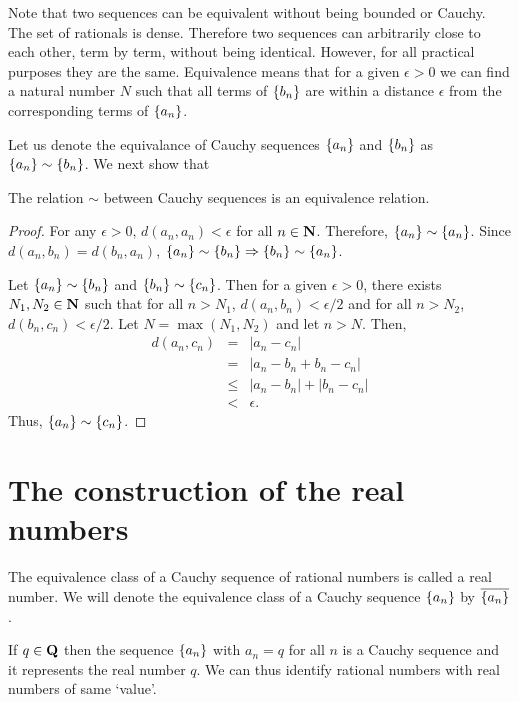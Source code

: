 Note that two sequences can be equivalent without being bounded or Cauchy.
The set of rationals is dense. Therefore two sequences can arbitrarily 
close to each other, term by term, without being identical. However, for
all practical purposes they are the same. Equivalence means that for a
given $\epsilon > 0$ we can find a natural number $N$ such that all terms
of $\{b_n\}$ are within a distance $\epsilon$ from the corresponding 
terms of $\{a_n\}$.

Let us denote the equivalance of Cauchy sequences $\{a_n\}$ and 
$\{b_n\}$ as $\{a_n\} \sim \{b_n\}$. We next show that
\begin{prop}\label{c4s2p1}
The relation $\sim$ between Cauchy sequences is an equivalence relation.
\end{prop}
\begin{proof}
For any $\epsilon > 0$, $d(a_n, a_n) < \epsilon$ for all $n \in \mathbf{N}$.
Therefore, $\{a_n\} \sim \{a_n\}$. Since $d(a_n, b_n) = d(b_n, a_n)$, 
$\{a_n\} \sim \{b_n\} \Rightarrow \{b_n\} \sim \{a_n\}$.

Let $\{a_n\} \sim \{b_n\}$ and $\{b_n\} \sim \{c_n\}$. Then for a
given $\epsilon > 0$, there exists $N_1, N_2 \in \mathbf{N}$ such that for all
$n > N_1$, $d(a_n, b_n) < \epsilon/2$ and for all $n > N_2$, $d(b_n, c_n)
< \epsilon/2$. Let $N = \max(N_1, N_2)$ and let $n > N$. Then,
\begin{eqnarray*}
d(a_n, c_n) &=& |a_n - c_n| \\
 &=& |a_n - b_n + b_n - c_n| \\
 &\le& |a_n - b_n| + |b_n - c_n| \\
 &<& \epsilon.
\end{eqnarray*}
Thus, $\{a_n\} \sim \{c_n\}$.
\end{proof}

\section{The construction of the real numbers}\label{c4s3}
\begin{defn}\label{c4s3d1}
The equivalence class of a Cauchy sequence of rational numbers is called 
a real number. We will denote the equivalence class of a Cauchy sequence
$\{a_n\}$ by $\overline{\{a_n\}}$.
\end{defn}

\begin{rem}
If $q \in \mathbf{Q}$ then the sequence $\{a_n\}$ with $a_n = q$ for all $n$
is a Cauchy sequence and it represents the real number $q$. We can thus
identify rational numbers with real numbers of same `value'.
\end{rem}

